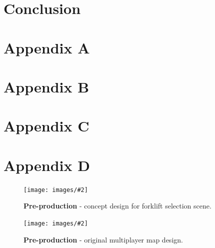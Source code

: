\documentclass[12pt]{article}
\newcommand{\figuremacro}[5]{
	\begin{figure}[#1]
		\centering
		\texttt{[image: images/\#2]}
		\caption[#3]{\textbf{#3}#4}
		\label{fig:#2}
	\end{figure}
}
\begin{document}
\section{Conclusion}

\newpage
\clearpage

\section{Appendix A}

\section{Appendix B}

\section{Appendix C}
\section{Appendix D}

\figuremacro{h}{conceptForkSelect}{Pre-production }{- concept design for forklift selection scene.}{1.0}
\figuremacro{h}{overheadMapLayout}{Pre-production }{- original multiplayer map design.}{1.0}
\end{document}
